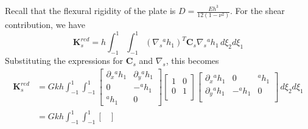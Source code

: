\documentclass[12pt]{article}
\begin{document}
Recall that the flexural rigidity of the plate is $D = \frac{E h^3}{12(1-\nu^2)}$.
For the shear contribution, we have
$$ \mathbf K^{red}_s  = h\int_{-1}^1\int_{-1}^1 (\nabla_s{}^a h_1)^T \mathbf C_s \nabla_s{}^a h_1\, d\xi_2d\xi_1 $$
Substituting the expressions for $\mathbf{C}_s$ and $\nabla_s$, this becomes
\begin{align*}
    \mathbf K^{red}_s & =Gkh\int_{-1}^1\int_{-1}^1 \begin{bmatrix}
                                                       \partial_x{}^a h_1 & \partial_y{}^a h_1 \\
                                                       0                  & -{}^a h_1          \\
                                                       {}^a h_1           & 0
                                                   \end{bmatrix}\begin{bmatrix}
                                                                    1 & 0 \\                                                                                      0 & 1 \\                                                                                    \end{bmatrix}\begin{bmatrix}
                                                                                                                                                                                                                                                                           \partial_x{}^a h_1 & 0         & {}^a h_1 \\
                                                                                                                                                                                                                                                                           \partial_y{}^a h_1 & -{}^a h_1 & 0        \\
                                                                                                                                                                                                                                                                       \end{bmatrix}\, d\xi_2d\xi_1 \\
                      & =Gkh\int_{-1}^1\int_{-1}^1 \begin{bmatrix}

\end{bmatrix}
\end{align*}
\end{document}
